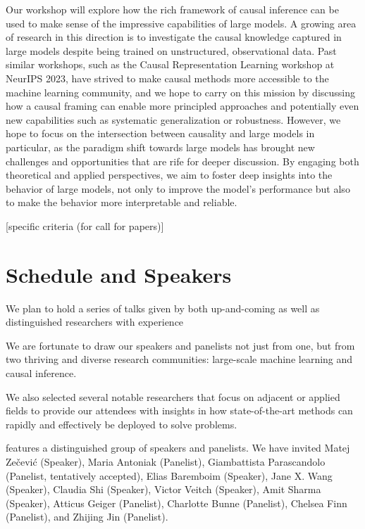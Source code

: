 \documentclass{article}
\begin{document}
Our workshop will explore how the rich framework of causal inference can be used to make sense of the impressive capabilities of large models. 
A growing area of research in this direction is to investigate the causal knowledge captured in large models despite being trained on unstructured, observational data. 
Past similar workshops, such as the Causal Representation Learning workshop at NeurIPS 2023, have strived to make causal methods more accessible to the machine learning community, and we hope to carry on this mission by discussing how a causal framing can enable more principled approaches and potentially even new capabilities such as systematic generalization or robustness. However, we hope to focus on the intersection between causality and large models in particular, as the paradigm shift towards large models has brought new challenges and opportunities that are rife for deeper discussion.
By engaging both theoretical and applied perspectives, we aim to foster deep insights into the behavior of large models, not only to improve the model's performance but also to make the behavior more interpretable and reliable.

% 

[specific criteria (for call for papers)]


\section{Schedule and Speakers}

We plan to hold a series of talks given by both up-and-coming as well as distinguished researchers with experience

We are fortunate to draw our speakers and panelists not just from one, but from two thriving and diverse research communities: large-scale machine learning and causal inference.

We also selected several notable researchers that focus on adjacent or applied fields to provide our attendees with insights in how state-of-the-art methods can rapidly and effectively be deployed to solve problems.

features a distinguished group of speakers and panelists. We have invited  Matej Zečević (Speaker), Maria Antoniak (Panelist), Giambattista Parascandolo (Panelist, tentatively accepted), Elias Baremboim (Speaker), Jane X. Wang (Speaker), Claudia Shi (Speaker), Victor Veitch (Speaker), Amit Sharma (Speaker), Atticus Geiger (Panelist), Charlotte Bunne (Panelist), Chelsea Finn (Panelist), and Zhijing Jin (Panelist).
\end{document}

